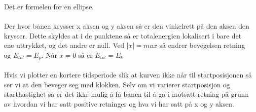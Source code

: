 \documentclass[norsk,a4paper,12pt]{article}
\begin{document}
Det er formelen for en ellipse.
\\
\\
Der hvor banen krysser x aksen og y aksen så er den vinkelrett på den aksen den krysser. Dette skyldes at i de punktene så er totalenergien lokalisert i bare det ene uttrykket, og det andre er null. Ved $|x| = max$ så endrer bevegelsen retning og $E_{tot} = E_p$. Når $x=0$ så er $E_{tot}=E_k$
\\
\\
Hvis vi plotter en kortere tidsperiode slik at kurven ikke når til startposisjonen så ser vi at den beveger seg med klokken. Selv om vi varierer startposisjon og starthastighet så er det ikke mulig å få banen til å gå i motsatt retning på grunn av hvordan vi har satt positive retninger og hva vi har satt på x og y aksen.
\\
\end{document}
